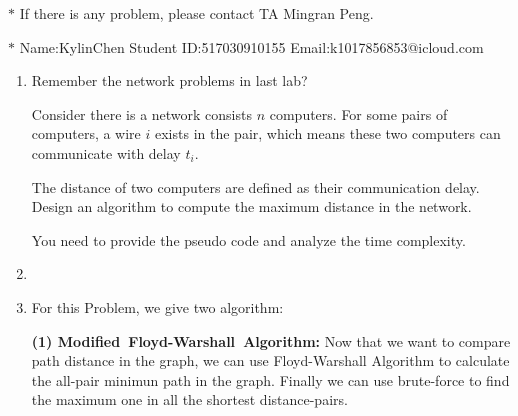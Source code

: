 \documentclass[12pt,a4paper]{article}
\makeatletter
\newtheorem*{solution}{Solution}
\theoremstyle{definition}
\renewenvironment{solution}[1][Solution] {\par\pushQED{\qed}\normalfont\topsep6\p@\@plus6\p@\relax\trivlist\item[\hskip\labelsep\bfseries#1\@addpunct{.}]\ignorespaces}{\popQED\endtrivlist\@endpefalse} \makeatother
\makeatother
\begin{document}
\noindent

\noindent{}


\begin{center}
\footnotesize{\color{red}$*$ If there is any problem, please contact TA Mingran Peng.}\par
\footnotesize{\color{blue}$*$ Name:KylinChen  \quad Student ID:517030910155 \quad Email:k1017856853@icloud.com }
\end{center}
\begin{enumerate}
    
    \item
    Remember the network problems in last lab?\par
    Consider there is a network consists $n$ computers. For some pairs of computers, a wire $i$ exists in the pair, which means these two computers can communicate with delay $t_i$.\par
The distance of two computers are defined as their communication delay. Design an algorithm to compute the maximum distance in the network.\par
You need to provide the pseudo code and analyze the time complexity.\par

\begin{solution}\item
\renewcommand{\qedsymbol}{}


    For this Problem, we give two algorithm:

    \textbf{(1) Modified\ Floyd-Warshall\ Algorithm: }Now that we want to compare path distance in the graph, we can use Floyd-Warshall Algorithm to calculate the all-pair minimun path in the graph. Finally we can use brute-force to find the maximum one in all the shortest distance-pairs.


\end{solution}
\end{enumerate}
\end{document}
